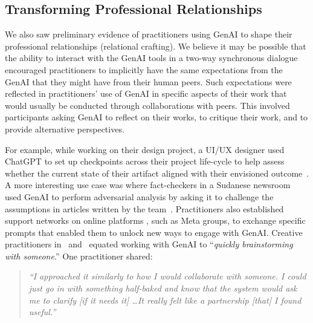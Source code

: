 \subsection{Transforming Professional Relationships}
\label{sec:relational}
We also saw preliminary evidence of practitioners using GenAI to shape their professional relationships (relational crafting). We believe it may be possible that the ability to interact with the GenAI tools in a two-way synchronous dialogue encouraged practitioners to implicitly have the same expectations from the GenAI that they might have from their human peers. Such expectations were reflected in practitioners' use of GenAI in specific aspects of their work that would usually be conducted through collaborations with peers. This involved participants asking GenAI to reflect on their works, to critique their work, and to provide alternative perspectives. 

For example, while working on their design project, a UI/UX designer used ChatGPT to set up checkpoints across their project life-cycle to help assess whether the current state of their artifact aligned with their envisioned outcome~\cite{6}. A more interesting use case was where fact-checkers in a Sudanese newsroom used GenAI to perform adversarial analysis by asking it to challenge the assumptions in articles written by the team~\cite{1}. Practitioners also established support networks on online platforms \cite{7,18}, such as Meta groups, to exchange specific prompts that enabled them to unlock new ways to engage with GenAI. 
Creative practitioners in~\cite{10} and~\cite{6} equated working with GenAI to ``\textit{quickly brainstorming with someone}.'' One practitioner shared:

\begin{quote}
    \textit{``I approached it similarly to how I would collaborate with someone. I could just go in with something half-baked and know that the system would ask me to clarify [if it needs it] \dots It really felt like a partnership [that] I found useful.''}
\end{quote}

